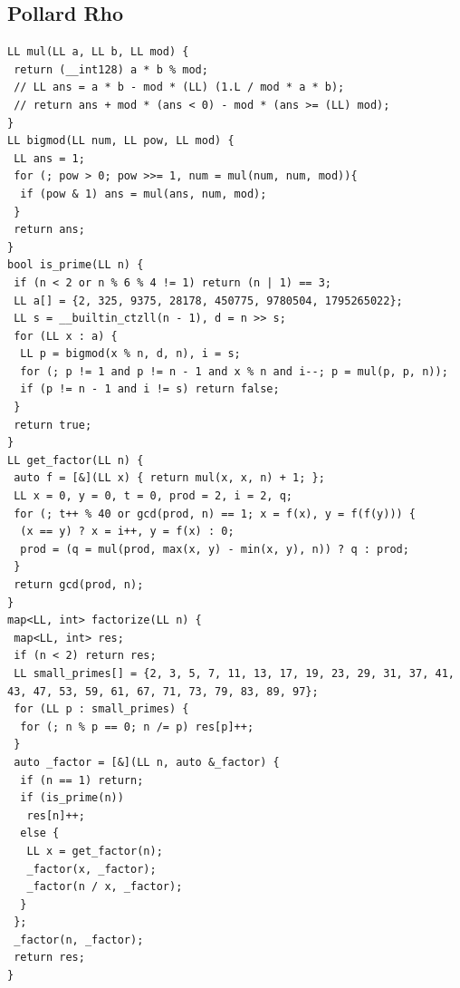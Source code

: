 \documentclass[a4paper,11pt,oneside]{article}
\begin{document}
\begin{multicols*}{\COLS}
\subsection{Pollard Rho}
\begin{lstlisting}
LL mul(LL a, LL b, LL mod) {
 return (__int128) a * b % mod;
 // LL ans = a * b - mod * (LL) (1.L / mod * a * b);
 // return ans + mod * (ans < 0) - mod * (ans >= (LL) mod);
}
LL bigmod(LL num, LL pow, LL mod) {
 LL ans = 1;
 for (; pow > 0; pow >>= 1, num = mul(num, num, mod)){
  if (pow & 1) ans = mul(ans, num, mod);
 }
 return ans;
}
bool is_prime(LL n) {
 if (n < 2 or n % 6 % 4 != 1) return (n | 1) == 3;
 LL a[] = {2, 325, 9375, 28178, 450775, 9780504, 1795265022};
 LL s = __builtin_ctzll(n - 1), d = n >> s;
 for (LL x : a) {
  LL p = bigmod(x % n, d, n), i = s;
  for (; p != 1 and p != n - 1 and x % n and i--; p = mul(p, p, n));
  if (p != n - 1 and i != s) return false;
 }
 return true;
}
LL get_factor(LL n) {
 auto f = [&](LL x) { return mul(x, x, n) + 1; };
 LL x = 0, y = 0, t = 0, prod = 2, i = 2, q;
 for (; t++ % 40 or gcd(prod, n) == 1; x = f(x), y = f(f(y))) {
  (x == y) ? x = i++, y = f(x) : 0;
  prod = (q = mul(prod, max(x, y) - min(x, y), n)) ? q : prod;
 }
 return gcd(prod, n);
}
map<LL, int> factorize(LL n) {
 map<LL, int> res;
 if (n < 2) return res;
 LL small_primes[] = {2, 3, 5, 7, 11, 13, 17, 19, 23, 29, 31, 37, 41, 43, 47, 53, 59, 61, 67, 71, 73, 79, 83, 89, 97};
 for (LL p : small_primes) {
  for (; n % p == 0; n /= p) res[p]++;
 }
 auto _factor = [&](LL n, auto &_factor) {
  if (n == 1) return;
  if (is_prime(n))
   res[n]++;
  else {
   LL x = get_factor(n);
   _factor(x, _factor);
   _factor(n / x, _factor);
  }
 };
 _factor(n, _factor);
 return res;
}
\end{lstlisting}

\end{multicols*}
\end{document}

